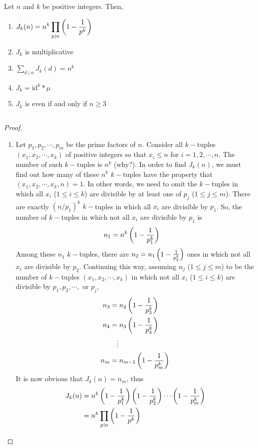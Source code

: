 	\begin{theorem}
		Let $n$ and $k$ be positive integers. Then,
			\begin{enumerate}
				\item $\displaystyle J_k(n) = n^k \prod\limits_{p\mid n}\left(1 - \frac{1}{p^k}\right)$
				\item $J_k$ is multiplicative
				\item $\displaystyle \sum_{d\mid n} J_k(d) = n^k$
				\item $J_k = \text{id}^k \ast \mu$
				\item $J_k$ is even if and only if $n \geq 3$
			\end{enumerate}
	\end{theorem}
$ $

	\begin{proof}
		$ $
		\begin{enumerate}
			\item Let $p_1,p_2,\cdots,p_m$ be the prime factors of $n$. Consider all $k-$tuples $(x_1,x_2,\cdots,x_k)$ of positive integers so that $x_i\leq n$ for $i=1,2,\cdots,n$. The number of such $k-$tuples is $n^k$ (why?). In order to find $J_k(n)$, we must find out how many of these $n^k$ $k-$tuples have the property that $(x_1,x_2,\cdots,x_k,n)=1$. In other words, we need to omit the $k-$tuples in which all $x_i$ ($1 \leq i \leq k$) are divisible by at least one of $p_j$ ($1 \leq j \leq m$). There are exactly $(n/p_1)^k$ $k-$tuples in which all $x_i$ are divisible by $p_1$. So, the number of $k-$tuples in which not all $x_i$ are divisible by $p_1$ is
				\begin{align*}
					n_1 &= n^k\left(1 - \frac{1}{p_1^k}\right)
				\end{align*}
			Among these $n_1$ $k-$tuples, there are $n_2 = n_{1}\left(1 - \frac{1}{p_2^k}\right)$ ones in which not all $x_i$ are divisible by $p_2$. Continuing this way, assuming $n_j$ ($1 \leq j \leq m$) to be the number of $k-$tuples $(x_1,x_2,\cdots,x_k)$ in which not all $x_i$ ($1 \leq i \leq k$) are divisible by $p_1, p_2, \cdots, $ or $p_j$,
				\begin{align*}
					n_3 &= n_2\left(1 - \frac{1}{p_3^k}\right)\\
					n_4 &= n_3\left(1 - \frac{1}{p_4^k}\right)\\
					&\phantom{=}\vdots\\
					n_m &= n_{m-1}\left(1 - \frac{1}{p_m^k}\right)
				\end{align*}
			It is now obvious that $J_k(n)=n_m$, thus
				\begin{align*}
					J_k(n) &= n^k\left(1 - \frac{1}{p_1^k}\right)\left(1 - \frac{1}{p_2^k}\right)\cdots\left(1 - \frac{1}{p_m^k}\right)\\
			   &= n^k \prod\limits_{p\mid n} \left(1 - \frac{1}{p^k}\right)
				\end{align*}


\end{enumerate}
\end{proof}
